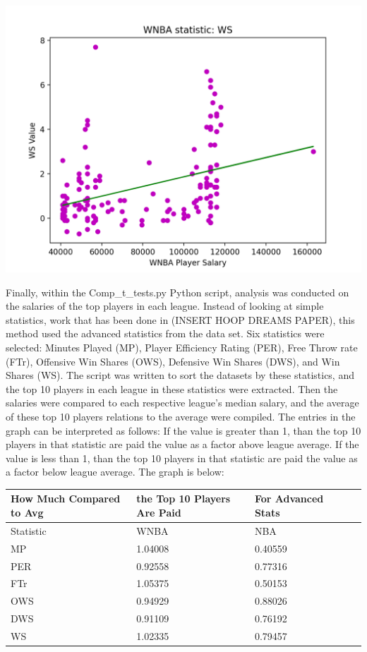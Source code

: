 \documentclass[12pt]{article}
\begin{document}
\newline
\includegraphics[width=.85\textwidth]{WNBA_WS_Graph.png}

\par
Finally, within the Comp\_t\_tests.py Python script, analysis was conducted on the salaries of the top players in each league. Instead of looking at simple statistics, work that has been done in (INSERT HOOP DREAMS PAPER), this method used the advanced statistics from the data set. Six statistics were selected: Minutes Played (MP), Player Efficiency Rating (PER), Free Throw rate (FTr), Offensive Win Shares (OWS), Defensive Win Shares (DWS), and Win Shares (WS). The script was written to sort the datasets by these statistics, and the top 10 players in each league in these statistics were extracted. Then the salaries were compared to each respective league's median salary, and the average of these top 10 players relations to the average were compiled. The entries in the graph can be interpreted as follows: If the value is greater than 1, than the top 10 players in that statistic are paid the value as a factor above league average. If the value is less than 1, than the top 10 players in that statistic are paid the value as a factor below league average. The graph is below:
\vspace*{1cm}
\begin{tabular}{*5l} 
\toprule
How Much Compared to Avg & the Top 10 Players Are Paid & For Advanced Stats \\\midrule

Statistic &  WNBA  & NBA \\ 

 MP  &  1.04008  & 0.40559 \\
 PER   &  0.92558   & 0.77316        \\       
 FTr   &  1.05375   & 0.50153       \\         
 OWS   & 0.94929    & 0.88026        \\
 DWS  & 0.91109    & 0.76192       \\
 WS   &  1.02335  & 0.79457                 \\
 \hline
\end{tabular}
\end{document}
